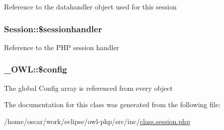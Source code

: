 Reference to the datahandler object used for this session \hypertarget{classSession_8ce7c23ff67100e8c62bb187cdf4921c}{
\subsubsection{\setlength{\rightskip}{0pt plus 5cm}Session::\$sessionhandler}}
\label{classSession_8ce7c23ff67100e8c62bb187cdf4921c}


Reference to the PHP session handler \hypertarget{class__OWL_f37a011667dda12fc417a68a6f3077d1}{
\subsubsection{\setlength{\rightskip}{0pt plus 5cm}\_\-OWL::\$config}}
\label{class__OWL_f37a011667dda12fc417a68a6f3077d1}


The global Config array is referenced from every object 

The documentation for this class was generated from the following file:\begin{CompactItemize}
\item 
/home/oscar/work/eclipse/owl-php/src/inc/\hyperlink{class_8session_8php}{class.session.php}\end{CompactItemize}

